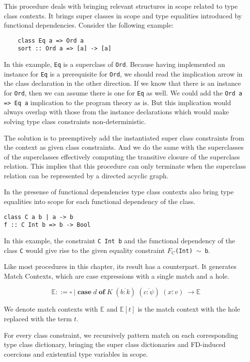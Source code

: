 This procedure deals with bringing relevant structures in scope related
to type class contexts. It brings super classes in scope and type equalities
introduced by functional dependencies. Consider the following example:
\begin{verbatim}
    class Eq a => Ord a
    sort :: Ord a => [a] -> [a]
\end{verbatim}
In this example, \texttt{Eq} is a superclass of \texttt{Ord}. Because having
implemented an instance for \texttt{Eq} is a prerequisite for \texttt{Ord}, we
should read the implication arrow in the class declaration in the other
direction. If we know that there is an instance for \texttt{Ord}, then we can
assume there is one for \texttt{Eq} as well. We could add the \texttt{Ord a =>
Eq a} implication to the program theory as is. But this implication would
always overlap with those from the instance declarations which would make
solving type class constraints non-deterministic.

The solution is to preemptively add the instantiated super class constraints
from the context as given class constraints. And we do the same with the
superclasses of the superclasses effectively computing the transitive closure of
the superclass relation. This implies that this procedure can only terminate
when the superclass relation can be represented by a directed acyclic graph.

In the presense of functional dependencies type class contexts also bring type
equalities into scope for each functional dependency of the class.
\begin{verbatim}
class C a b | a -> b
f :: C Int b => b -> Bool
\end{verbatim}
In this example, the constraint \texttt{C Int b} and the functional dependency
of the class \texttt{C} would give rise to the given equality constraint
\texttt{$F_C$(Int) $\sim$ b}.

Like most procedures in this chapter, its result has a \systemfc
counterpart. It generates Match Contexts, which are case expressions with a
single match and a hole.
\begin{figure}[h]
$$
\mathbb{E} ::= \square \mid \textbf{case} \; d \; \textbf{of} \; K \;
(\overline{b : k}) \; (\overline{c : \psi}) \; (\overline{x : v}) \; \rightarrow
\mathbb{E}
$$
\end{figure}
We denote match contexts with $\mathbb{E}$ and $\mathbb{E}[t]$ is the match
context with the hole replaced with the term $t$.

For every class constraint, we recursively pattern match on each corresponding
type class dictionary, bringing the super class dictionaries and FD-induced
coercions and existential type variables in scope.

